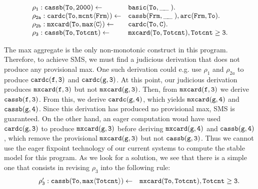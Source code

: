\documentclass[11pt]{article}
\def\mt{\tt}
\newcommand{\cldl}{\[\begin{array}{ll}}
\newcommand{\eldl}{\end{array}\]\rm}
\newcommand{\prule}[2]{ \mt #1 \leftarrow & \mt #2 \\}
\def\inv{\vspace{-0.2cm}}
\def\sinv{\vspace{-0.1cm}}
\def\inv{\vspace{-0.2cm}}
\def\sinv{\vspace{-0.1cm}}
\def\f--{\tt{ \_\!\_\;}}
\begin{document}
 \begin{example} 
 \label{ex:countbis}
\inv\sinv\cldl
 \prule {\rho_1: cassb(To,  2000)}{basic(To, \f--).}
 \prule{\rho_{2a}:   cardc(To, mcnt\langle  Frm \rangle)}  {cassb(Frm, \f--),  arc(Frm, To).}
\prule{\rho_{2b} :   mxcard(To, max\langle C \rangle)} {  cardc(To, C ).}
 \prule{\rho_3:  cassb(To, Totcnt)} { mxcard(To, Totcnt ),  Totcnt \geq 3.}
 \eldl
\end{example}


The max aggregate is the only non-monotonic construct in this program.  Therefore, to achieve SMS, we must find
a judicious derivation that does not produce any provisional max.  One such derivation could e.g. use
$\rho_1$ and $\rho_{2a}$ to produce
$\tt cardc(f, 3)$  and  $\tt cardc(g, 3)$.    At this point, our judicious derivation produces $\tt mxcard(f, 3)$ but not $\tt mxcard(g, 3)$.   
Then, from  
$\tt mxcard(f, 3)$  we derive   $\tt cassb(f, 3)$.  From this, we derive  $\tt cardc(g, 4)$, which yields $\tt mxcard(g, 4)$ 
and $\tt cassb(g, 4)$. Since this derivation has produced no provisional max, SMS is guaranteed. On the other 
hand, an eager computation woud have used  $\tt cardc(g, 3)$ to produce $\tt mxcard(g, 3)$ 
before deriving $\tt mxcard(g, 4)$ and  $\tt cassb(g, 4)$, which  remove the provisional  $\tt mxcard(g, 3)$
but not   $\tt cassb(g, 3)$.   Thus we cannot use  the eager fixpoint technology of our current systems
to compute the stable model for this program. As we look for a solution, we see that
there is a  simple one that consists in  revising  $\rho_3$ into the
following rule:
\sinv \inv\cldl
\prule{~~~~~~~~\rho'_3:  cassb(To, max\langle Totcnt \rangle)} { mxcard(To,  Totcnt ),  Totcnt  \geq 3.\sinv}
\eldl
\end{document}
